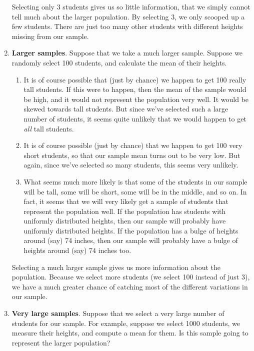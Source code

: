 \documentclass[../../../main.tex]{subfiles}
\begin{document}
\begin{enumerate}
\begin{enumerate}
  \end{enumerate}
  
  Selecting only 3 students gives us so little information, that we simply cannot tell much about the larger population. By selecting 3, we only scooped up a few students. There are just too many other students with different heights missing from our sample. 
  
  \item \textbf{Larger samples}. Suppose that we take a much larger sample. Suppose we randomly select 100 students, and calculate the mean of their heights.
  
  \begin{enumerate}

    \item It is of course possible that (just by chance) we happen to get 100 really tall students. If this were to happen, then the mean of the sample would be high, and it would not represent the population very well. It would be skewed towards tall students. But since we've selected such a large number of students, it seems quite unlikely that we would happen to get \emph{all} tall students. 
    
    \item It is of course possible (just by chance) that we happen to get 100 very short students, so that our sample mean turns out to be very low. But again, since we've selected so many students, this seems very unlikely.
    
    \item What seems much more likely is that some of the students in our sample will be tall, some will be short, some will be in the middle, and so on. In fact, it seems that we will very likely get a sample of students that represent the population well. If the population has students with uniformly distributed heights, then our sample will probably have uniformly distributed heights. If the population has a bulge of heights around (say) 74 inches, then our sample will probably have a bulge of heights around (say) 74 inches too. 

  \end{enumerate} 
  
  Selecting a much larger sample gives us more information about the population. Because we select more students (we select 100 instead of just 3), we have a much greater chance of catching most of the different variations in our sample.

  \item \textbf{Very large samples}. Suppose that we select a very large number of students for our sample. For example, suppose we select 1000 students, we measure their heights, and compute a mean for them. Is this sample going to represent the larger population? 
  

\end{enumerate}
\end{document}
